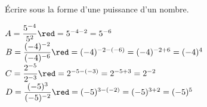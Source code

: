     Écrire sous la forme d'une puissance d'un nombre.
        \begin{spacing}{2}
            $A=\dfrac{5^{-4}}{5^2}          {\red = 5^{-4-2} = 5^{-6}}$
            $B=\dfrac{(-4)^{-2}}{(-4)^{-6}} {\red = (-4)^{-2-(-6)} = (-4)^{-2+6} = (-4)^4}$
            $C=\dfrac{2^{-5}}{2^{-3}}       {\red = 2^{-5-(-3)} = 2^{-5+3} = 2^{-2}}$
            $D=\dfrac{(-5)^{3}}{(-5)^{-2}}  {\red = (-5)^{3-(-2)} = (-5)^{3+2} = (-5)^5}$
        \end{spacing}
